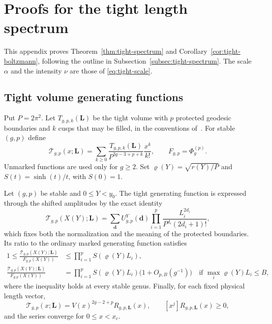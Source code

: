 \section{Proofs for the tight length spectrum}\label{app:tight}

This appendix proves Theorem~\ref{thm:tight-spectrum} and
Corollary~\ref{cor:tight-boltzmann}, following the outline in
Subsection~\ref{subsec:tight-spectrum}. The scale $\alpha$ and the
intensity $\nu$ are those of \eqref{eq:tight-scale}.

\subsection{Tight volume generating functions}\label{subsec:tight-gf}

Put $P=2\pi^2$. Let $T_{g,p,k}(\mathbf L)$ be the tight volume with
$p$ protected geodesic boundaries and $k$ cusps that may be filled,
in the conventions of~\cite{Budd,BZ,BL}. For stable $(g,p)$ define
\[
 \mathscr T_{g,p}(x;\mathbf L)
 =\sum_{k\ge0}\frac{T_{g,p,k}(\mathbf L)}{P^{3g-3+p+k}}
                 \frac{x^k}{k!},\qquad F_{g,p}=\Phi_g^{(p)}.
\]
Unmarked functions are used only for $g\ge2$. Set
$\varrho(Y)=\sqrt{r(Y)/P}$ and $S(t)=\sinh(t)/t$, with $S(0)=1$.

\begin{lemma}\label{lem:tight-gf}
Let $(g,p)$ be stable and $0\le Y<y_0$. The tight generating function is
expressed through the shifted amplitudes by the exact identity
\begin{equation}
 \mathscr T_{g,p}(X(Y);\mathbf L)
 =\sum_{\mathbf d}U^Y_{g,p}(\mathbf d)
       \prod_{i=1}^p\frac{L_i^{2d_i}}{P^{d_i}(2d_i+1)!},
 \label{eq:tight-insertion}
\end{equation}
which fixes both the normalization and the meaning of the protected
boundaries. Its ratio to the ordinary marked generating function satisfies
\begin{equation}
 \begin{split}
 1\le\frac{\mathscr T_{g,p}(X(Y);\mathbf L)}{F_{g,p}(X(Y))}
   &\le\prod_{i=1}^p S(\varrho(Y)L_i),\\
 \frac{\mathscr T_{g,p}(X(Y);\mathbf L)}{F_{g,p}(X(Y))}
   &=\prod_{i=1}^p S(\varrho(Y)L_i)
        \bigl(1+O_{p,B}(g^{-1})\bigr)
       \quad\text{if }\max_i\varrho(Y)L_i\le B,
 \end{split}
 \label{eq:tight-real}
\end{equation}
where the inequality holds at every stable genus. Finally, for each fixed
physical length vector,
\begin{equation}
 \mathscr T_{g,p}(x;\mathbf L)=V(x)^{2g-2+p}R_{g,p,\mathbf L}(x),
 \qquad [x^j]R_{g,p,\mathbf L}(x)\ge0,
 \label{eq:tight-positive}
\end{equation}
and the series converge for $0\le x<x_c$.
\end{lemma}

